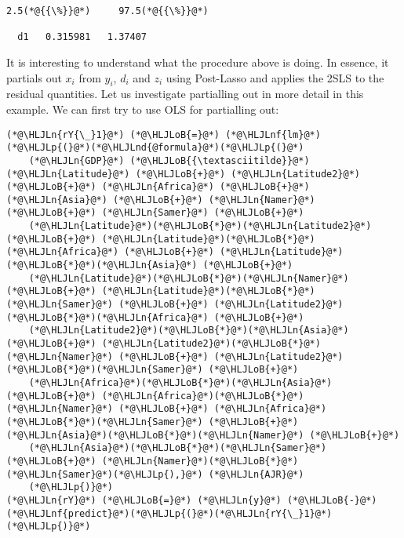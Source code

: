 \documentclass[12pt,a4paper]{article}
\newcommand{\HLJLn}[1]{#1}
\newcommand{\HLJLnd}[1]{\textcolor[RGB]{214,102,97}{#1}}
\newcommand{\HLJLnf}[1]{\textcolor[RGB]{66,102,213}{#1}}
\newcommand{\HLJLoB}[1]{\textcolor[RGB]{102,102,102}{\textbf{#1}}}
\newcommand{\HLJLp}[1]{#1}
\begin{document}
\begin{lstlisting}
2.5(*@{{\%}}@*)     97.5(*@{{\%}}@*)

  d1   0.315981   1.37407
\end{lstlisting}


It is interesting to understand what the procedure above is doing. In essence, it partials out $x_i$ from $y_i$, $d_i$ and $z_i$ using Post-Lasso and applies the 2SLS to the residual quantities. Let us investigate partialling out in more detail in this example. We can first try to use OLS for partialling out:


\begin{lstlisting}
(*@\HLJLn{rY{\_}1}@*) (*@\HLJLoB{=}@*) (*@\HLJLnf{lm}@*)(*@\HLJLp{(}@*)(*@\HLJLnd{@formula}@*)(*@\HLJLp{(}@*)
    (*@\HLJLn{GDP}@*) (*@\HLJLoB{{\textasciitilde}}@*) (*@\HLJLn{Latitude}@*) (*@\HLJLoB{+}@*) (*@\HLJLn{Latitude2}@*) (*@\HLJLoB{+}@*) (*@\HLJLn{Africa}@*) (*@\HLJLoB{+}@*) (*@\HLJLn{Asia}@*) (*@\HLJLoB{+}@*) (*@\HLJLn{Namer}@*) (*@\HLJLoB{+}@*) (*@\HLJLn{Samer}@*) (*@\HLJLoB{+}@*) 
    (*@\HLJLn{Latitude}@*)(*@\HLJLoB{*}@*)(*@\HLJLn{Latitude2}@*) (*@\HLJLoB{+}@*) (*@\HLJLn{Latitude}@*)(*@\HLJLoB{*}@*)(*@\HLJLn{Africa}@*) (*@\HLJLoB{+}@*) (*@\HLJLn{Latitude}@*)(*@\HLJLoB{*}@*)(*@\HLJLn{Asia}@*) (*@\HLJLoB{+}@*) 
    (*@\HLJLn{Latitude}@*)(*@\HLJLoB{*}@*)(*@\HLJLn{Namer}@*) (*@\HLJLoB{+}@*) (*@\HLJLn{Latitude}@*)(*@\HLJLoB{*}@*)(*@\HLJLn{Samer}@*) (*@\HLJLoB{+}@*) (*@\HLJLn{Latitude2}@*)(*@\HLJLoB{*}@*)(*@\HLJLn{Africa}@*) (*@\HLJLoB{+}@*) 
    (*@\HLJLn{Latitude2}@*)(*@\HLJLoB{*}@*)(*@\HLJLn{Asia}@*) (*@\HLJLoB{+}@*) (*@\HLJLn{Latitude2}@*)(*@\HLJLoB{*}@*)(*@\HLJLn{Namer}@*) (*@\HLJLoB{+}@*) (*@\HLJLn{Latitude2}@*)(*@\HLJLoB{*}@*)(*@\HLJLn{Samer}@*) (*@\HLJLoB{+}@*) 
    (*@\HLJLn{Africa}@*)(*@\HLJLoB{*}@*)(*@\HLJLn{Asia}@*) (*@\HLJLoB{+}@*) (*@\HLJLn{Africa}@*)(*@\HLJLoB{*}@*)(*@\HLJLn{Namer}@*) (*@\HLJLoB{+}@*) (*@\HLJLn{Africa}@*)(*@\HLJLoB{*}@*)(*@\HLJLn{Samer}@*) (*@\HLJLoB{+}@*) (*@\HLJLn{Asia}@*)(*@\HLJLoB{*}@*)(*@\HLJLn{Namer}@*) (*@\HLJLoB{+}@*) 
    (*@\HLJLn{Asia}@*)(*@\HLJLoB{*}@*)(*@\HLJLn{Samer}@*) (*@\HLJLoB{+}@*) (*@\HLJLn{Namer}@*)(*@\HLJLoB{*}@*)(*@\HLJLn{Samer}@*)(*@\HLJLp{),}@*) (*@\HLJLn{AJR}@*)
    (*@\HLJLp{)}@*)
(*@\HLJLn{rY}@*) (*@\HLJLoB{=}@*) (*@\HLJLn{y}@*) (*@\HLJLoB{-}@*) (*@\HLJLnf{predict}@*)(*@\HLJLp{(}@*)(*@\HLJLn{rY{\_}1}@*)(*@\HLJLp{)}@*)


\end{lstlisting}
\end{document}

